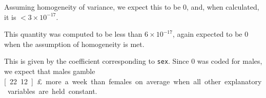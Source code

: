 \documentclass{homework}
\begin{document}
\begin{longproblem}
Assuming homogeneity of variance, we expect this to be $0$, and, when calculated, it is $< 3\times 10^{-17}$.


This quantity was computed to be less than $6\times 10^{-17}$, again expected to be 0 when the assumption of homogeneity is met. 


  This is given by the coefficient corresponding to \texttt{sex}.  Since $0$ was coded for males, we expect that males gamble \unit[22.12]{\pounds} more a week than females on average when all other explanatory variables are held constant.
\end{longproblem}
\newpage
\end{document}
